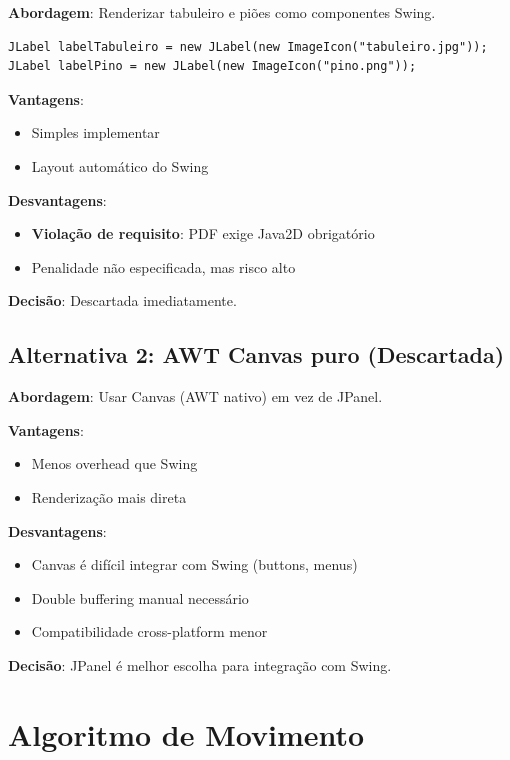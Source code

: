 \documentclass[12pt,a4paper]{report}
\begin{document}
\textbf{Abordagem}: Renderizar tabuleiro e piões como componentes Swing.

\begin{lstlisting}
JLabel labelTabuleiro = new JLabel(new ImageIcon("tabuleiro.jpg"));
JLabel labelPino = new JLabel(new ImageIcon("pino.png"));
\end{lstlisting}

\textbf{Vantagens}:
\begin{itemize}
    \item Simples implementar
    \item Layout automático do Swing
\end{itemize}

\textbf{Desvantagens}:
\begin{itemize}
    \item \textbf{Violação de requisito}: PDF exige Java2D obrigatório
    \item Penalidade não especificada, mas risco alto
\end{itemize}

\textbf{Decisão}: Descartada imediatamente.

\subsection{Alternativa 2: AWT Canvas puro (Descartada)}

\textbf{Abordagem}: Usar Canvas (AWT nativo) em vez de JPanel.

\textbf{Vantagens}:
\begin{itemize}
    \item Menos overhead que Swing
    \item Renderização mais direta
\end{itemize}

\textbf{Desvantagens}:
\begin{itemize}
    \item Canvas é difícil integrar com Swing (buttons, menus)
    \item Double buffering manual necessário
    \item Compatibilidade cross-platform menor
\end{itemize}

\textbf{Decisão}: JPanel é melhor escolha para integração com Swing.

\section{Algoritmo de Movimento}
\end{document}

